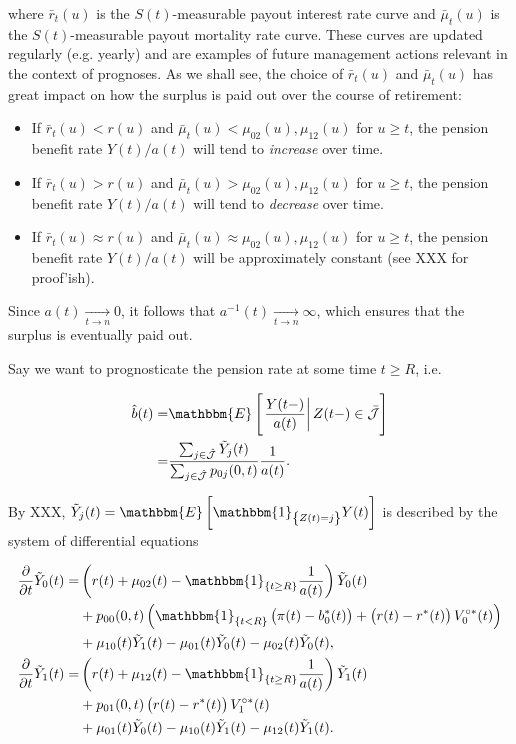 \documentclass{book}
\newcommand{\1}[1]{\mathbbm{1}_{\left\lbrace #1 \right\rbrace}}
\newcommand{\expec}[1][def]{\mathbbm{E} \left[ #1 \right]}
\newcommand{\econd}[2][def]{\mathbbm{E} \left[ \left. #1 \right| #2 \right]}
\theoremstyle{break}
\theoremstyle{remark}
\numberwithin{equation}{section}
\begin{document}
where $\bar{r}_t(u)$ is the $S(t)$-measurable payout interest rate curve and $\bar{\mu}_t(u)$ is the  $S(t)$-measurable payout mortality rate curve. These curves are updated regularly (e.g. yearly) and are examples of future management actions relevant in the context of prognoses. As we shall see, the choice of $\bar{r}_t(u)$ and $\bar{\mu}_t(u)$ has great impact on how the surplus is paid out over the course of retirement:

\begin{itemize}
	\item If $\bar{r}_t(u)<r(u)$ and $\bar{\mu}_t(u)<\mu_{02}(u),\mu_{12}(u)$ for $u \geq t$, the pension benefit rate $Y(t)/a(t)$ will tend to \textit{increase} over time.
	\item If $\bar{r}_t(u)>r(u)$ and $\bar{\mu}_t(u)>\mu_{02}(u),\mu_{12}(u)$ for $u \geq t$, the pension benefit rate $Y(t)/a(t)$ will tend to \textit{decrease} over time.
	\item If $\bar{r}_t(u)\approx r(u)$ and $\bar{\mu}_t(u)\approx \mu_{02}(u),\mu_{12}(u)$ for $u \geq t$, the pension benefit rate $Y(t)/a(t)$ will be approximately constant (see XXX for proof'ish).
\end{itemize}

Since $a(t) \underset{t \to n}{\longrightarrow} 0$, it follows that $a^{-1}(t) \underset{t \to n}{\longrightarrow} \infty$, which ensures that the surplus is eventually paid out.

Say we want to prognosticate the pension rate at some time $t \geq R$, i.e.

\begin{align*}
	\hat{b}(t) =& \econd[\frac{Y(t-)}{a(t)}]{Z(t-) \in \bar{\mathcal{J}}} \\
	=&\frac{\sum_{j \in \hat{\mathcal{J}}} \tilde{Y}_j(t)}{\sum_{j \in \hat{\mathcal{J}}} p_{0j}(0,t)} \frac{1}{a(t)}.
\end{align*}

By XXX, $\tilde{Y}_j(t) = \expec[\1{Z(t)=j} Y(t)]$ is described by the system of differential equations

\begin{align} \label{Jaja}
\begin{split}
	\frac{\partial}{\partial t} \tilde{Y}_0(t) =& \left( r(t) + \mu_{02}(t) - \1{t \geq R} \frac{1}{a(t)}\right) \tilde{Y}_0(t) \\
	&+ p_{00}(0,t) \left( \1{t<R} \left(\pi(t) - b_0^*(t)\right) + \left( r(t) - r^*(t) \right) V_{0}^{\circ*}(t) \right) \\
	&+ \mu_{10}(t) \tilde{Y}_1(t) - \mu_{01}(t) \tilde{Y}_0(t) - \mu_{02}(t) \tilde{Y}_0(t), \\
	\frac{\partial}{\partial t} \tilde{Y}_1(t) =& \left( r(t) + \mu_{12}(t) - \1{t \geq R} \frac{1}{a(t)}\right) \tilde{Y}_1(t) \\
	&+ p_{01}(0,t) \left( r(t) - r^*(t) \right) V_{1}^{\circ*}(t) \\
	&+ \mu_{01}(t) \tilde{Y}_0(t) - \mu_{10}(t) \tilde{Y}_1(t) - \mu_{12}(t) \tilde{Y}_1(t).
\end{split}
\end{align}
\end{document}
